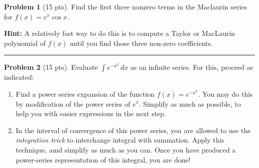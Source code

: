 \documentclass[12pt]{article}
\theoremstyle{definition}
\newtheorem{problem}{Problem}
\begin{document}
\bigskip
\begin{problem}[15 pts]
Find the first three nonzero terms in the Maclaurin series for $f(x)=e^x\cos x$.

\textbf{Hint:} A relatively fast way to do this is to compute a Taylor or MacLaurin polynomial of $f(x)$ until you find those three non-zero coefficients.
\vspace{7cm}
\end{problem}
\hrule

\begin{problem}[15 pts]
Evaluate $\int e^{-x^2}\, dx$ as an infinite series.  For this, proceed as indicated:
\begin{enumerate}
	\item Find a power series expansion of the function $f(x) = e^{-x^2}$.  You may do this by modification of the power series of $e^x$.  Simplify as much as possible, to help you with easier expressions in the next step.
	\item In the interval of convergence of this power series, you are allowed to use the \emph{integration trick} to interchange integral with summation.  Apply this technique, amd simplify as much as you can. Once you have produced a power-series representation of this integral, you are done!
	\end{enumerate}
\end{problem}
\end{document}
